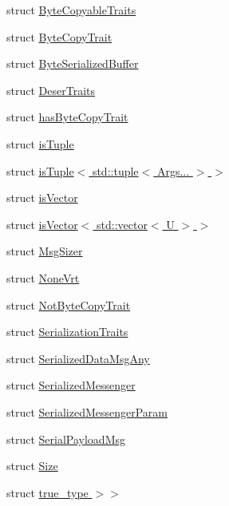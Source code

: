\begin{DoxyCompactItemize}
\item 
struct \hyperlink{structvt_1_1serialization_1_1_byte_copyable_traits}{Byte\+Copyable\+Traits}
\item 
struct \hyperlink{structvt_1_1serialization_1_1_byte_copy_trait}{Byte\+Copy\+Trait}
\item 
struct \hyperlink{structvt_1_1serialization_1_1_byte_serialized_buffer}{Byte\+Serialized\+Buffer}
\item 
struct \hyperlink{structvt_1_1serialization_1_1_deser_traits}{Deser\+Traits}
\item 
struct \hyperlink{structvt_1_1serialization_1_1has_byte_copy_trait}{has\+Byte\+Copy\+Trait}
\item 
struct \hyperlink{structvt_1_1serialization_1_1is_tuple}{is\+Tuple}
\item 
struct \hyperlink{structvt_1_1serialization_1_1is_tuple_3_01std_1_1tuple_3_01_args_8_8_8_01_4_01_4}{is\+Tuple$<$ std\+::tuple$<$ Args... $>$ $>$}
\item 
struct \hyperlink{structvt_1_1serialization_1_1is_vector}{is\+Vector}
\item 
struct \hyperlink{structvt_1_1serialization_1_1is_vector_3_01std_1_1vector_3_01_u_01_4_01_4}{is\+Vector$<$ std\+::vector$<$ U $>$ $>$}
\item 
struct \hyperlink{structvt_1_1serialization_1_1_msg_sizer}{Msg\+Sizer}
\item 
struct \hyperlink{structvt_1_1serialization_1_1_none_vrt}{None\+Vrt}
\item 
struct \hyperlink{structvt_1_1serialization_1_1_not_byte_copy_trait}{Not\+Byte\+Copy\+Trait}
\item 
struct \hyperlink{structvt_1_1serialization_1_1_serialization_traits}{Serialization\+Traits}
\item 
struct \hyperlink{structvt_1_1serialization_1_1_serialized_data_msg_any}{Serialized\+Data\+Msg\+Any}
\item 
struct \hyperlink{structvt_1_1serialization_1_1_serialized_messenger}{Serialized\+Messenger}
\item 
struct \hyperlink{structvt_1_1serialization_1_1_serialized_messenger_param}{Serialized\+Messenger\+Param}
\item 
struct \hyperlink{structvt_1_1serialization_1_1_serial_payload_msg}{Serial\+Payload\+Msg}
\item 
struct \hyperlink{structvt_1_1serialization_1_1_size}{Size}
\item 
struct \hyperlink{structvt_1_1serialization_1_1_size_3_01_msg_t_00_01typename_01std_1_1enable__if__t_3_01std_1_1true__type_01_4_4}{true\+\_\+type $>$$>$}
\end{DoxyCompactItemize}
